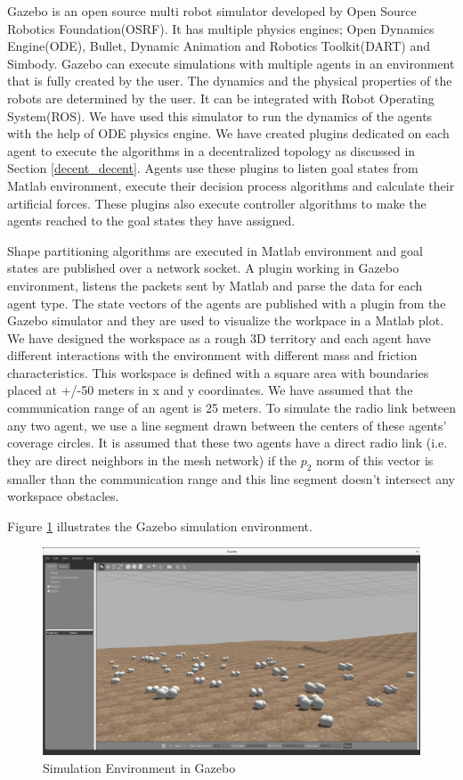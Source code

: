 Gazebo is an open source multi robot simulator developed by Open Source Robotics Foundation(OSRF). It has multiple physics engines; Open Dynamics Engine(ODE), Bullet, Dynamic Animation and Robotics Toolkit(DART) and Simbody. Gazebo can execute simulations with multiple agents in an environment that is fully created by the user. The dynamics and the physical properties of the robots are determined by the user. It can be integrated with Robot Operating System(ROS). We have used this simulator to run the dynamics of the agents with the help of ODE physics engine. We have created plugins dedicated on each agent to execute the algorithms in a decentralized topology as discussed in Section \ref{decent_decent}. Agents use these plugins to  listen goal states from Matlab environment, execute their decision process algorithms and calculate their artificial forces. These plugins also execute controller algorithms to make the agents reached to the goal states they have assigned.
 
Shape partitioning algorithms are executed in Matlab environment and goal states are published over a network socket. A plugin working in Gazebo environment, listens the packets sent by Matlab and parse the data for each agent type. The state vectors of the agents are published with a plugin from the Gazebo simulator and they are used to visualize the workpace in a Matlab plot. We have designed the workspace as a rough 3D territory and each agent have different interactions with the environment with different mass and friction characteristics. This workspace is defined with a square area with boundaries placed at +/-50 meters in x and y coordinates. We have assumed that the communication range of an agent is 25 meters. To simulate the radio link between any two agent, we use a line segment drawn between the centers of these agents' coverage circles. It is assumed that these two agents have a direct radio link (i.e. they are direct neighbors in the mesh network) if the $p_2$ norm of this vector is smaller than the communication range and this line segment doesn't intersect any workspace obstacles.

Figure \ref{Gazebo} illustrates the Gazebo simulation environment. 

\begin{figure}[H]
\caption{Simulation Environment in Gazebo} \label{Gazebo}
\centerline{\includegraphics[scale = 0.22]{gazebo_env}}
\end{figure} 

